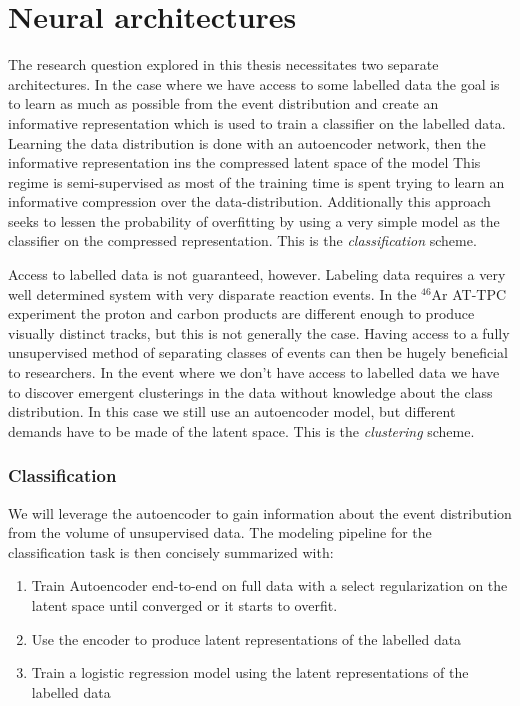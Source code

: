 \chapter{Neural architectures}\label{ch:architectures}

The research question explored in this thesis necessitates two separate architectures. In the case where we have access to some labelled data the goal is to learn as much as possible from the event distribution and create an informative representation which is used to train a classifier on the labelled data. Learning the data distribution is done with an autoencoder network, then the informative representation ins the compressed latent space of the model This regime is semi-supervised as most of the training time is spent trying to learn an informative compression over the data-distribution. Additionally this approach seeks to lessen the probability of overfitting by using a very simple model as the classifier on the compressed representation. This is the \textit{classification} scheme.

 Access to labelled data is not guaranteed, however. Labeling data requires a very well determined system with very disparate reaction events. In the ${}^{46}$Ar AT-TPC experiment the proton and carbon products are different enough to produce visually distinct tracks, but this is not generally the case. Having access to a fully unsupervised method of separating classes of events can then be hugely beneficial to researchers. In the event where we don't have access to labelled data we have to discover emergent clusterings in the data without knowledge about the class  distribution. In this case we still use an autoencoder model, but different demands have to be made of the latent space. This is the \textit{clustering} scheme. 

\subsection{Classification}
We will leverage  the autoencoder to gain information about the event distribution from the volume of unsupervised data. The modeling pipeline for the classification task is then concisely summarized with: 

\begin{enumerate}
\item Train Autoencoder end-to-end on full data with a select regularization on the latent space until converged or it starts to overfit. 
\item Use the encoder to produce latent representations of the labelled data 
\item Train a logistic regression model using the latent representations of the labelled data 
\end{enumerate}

